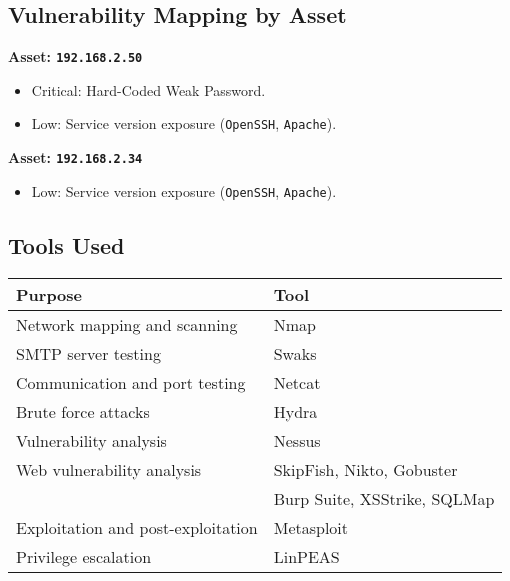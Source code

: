 \documentclass[a4paper,12pt]{article}
\begin{document}
\subsection{Vulnerability Mapping by Asset}

\textbf{Asset: \texttt{192.168.2.50}}  
\begin{itemize}
    \item \textcolor{BrickRed}{Critical}: Hard-Coded Weak Password.
    \item \textcolor{NavyBlue}{Low}: Service version exposure (\texttt{OpenSSH}, \texttt{Apache}).
\end{itemize}

\textbf{Asset: \texttt{192.168.2.34}}  
\begin{itemize}
    \item \textcolor{NavyBlue}{Low}: Service version exposure (\texttt{OpenSSH}, \texttt{Apache}).
\end{itemize}

\subsection{Tools Used}
\begin{table}[ht]
    \centering
    \begin{tabular}{ll}
        \toprule
        \rowcolor{gray!20} \textbf{Purpose} & \textbf{Tool} \\
        \midrule
        Network mapping and scanning & Nmap \\
        SMTP server testing & Swaks \\
        Communication and port testing & Netcat \\
        Brute force attacks & Hydra \\
        Vulnerability analysis & Nessus \\
        Web vulnerability analysis & SkipFish, Nikto, Gobuster \\ & Burp Suite, XSStrike, SQLMap \\
        Exploitation and post-exploitation & Metasploit \\
        Privilege escalation & LinPEAS \\
        \bottomrule
    \end{tabular}
\end{table}
\end{document}
